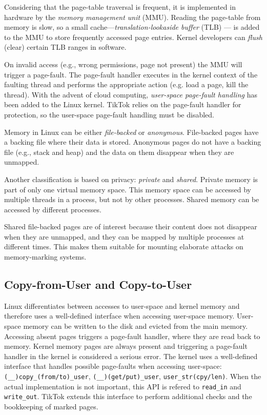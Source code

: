 \documentclass[conference]{IEEEtran}
\newcommand{\sysname}{TikTok}
\begin{document}
Considering that the page-table traversal is frequent, it is implemented in
hardware by the \emph{memory management unit} (MMU). Reading the page-table from
memory is slow, so a small cache---\emph{translation-lookaside buffer} (TLB)
--- is added to the MMU to store frequently accessed page entries. Kernel
developers can \emph{flush} (clear) certain TLB ranges in software.

On invalid access (e.g., wrong permissions, page not present) the MMU will
trigger a page-fault. The page-fault handler executes in the kernel context of
the faulting thread and performs the appropriate action (e.g. load a page, kill
the thread). With the advent of cloud computing, \emph{user-space page-fault
handling} has been added to the Linux kernel. \sysname{} relies on the page-fault
handler for protection, so the user-space page-fault handling must be disabled.

Memory in Linux can be either \emph{file-backed} or \emph{anonymous}.
File-backed pages have a backing file where their data is stored. Anonymous
pages do not have a backing file (e.g., stack and heap) and the data on them
disappear when they are unmapped.

Another classification is based on privacy: \emph{private} and \emph{shared}.
Private memory is part of only one virtual memory space. This memory space can
be accessed by multiple threads in a process, but not by other processes. Shared
memory can be accessed by different processes.

Shared file-backed pages are of interest because their content does not
disappear when they are unmapped, and they can be mapped by multiple
processes at different times. This makes them suitable for mounting elaborate
attacks on memory-marking systems.

\subsection{Copy-from-User and Copy-to-User}
\label{subsec:copy}
Linux differentiates between accesses to user-space and kernel memory and
therefore uses a well-defined interface when accessing user-space memory.
User-space memory can be written to the disk and evicted from the main memory.
Accessing absent pages triggers a page-fault handler, where they are read back
to memory. Kernel memory pages are always present and triggering a page-fault
handler in the kernel is considered a serious error. The kernel uses a well-defined
interface that handles possible page-faults when accessing user-space:
\texttt{(\_\_)copy\_(from/to)\_user}, \texttt{(\_\_)(get/put)\_user},
\texttt{user\_str(cpy/len)}. When the actual implementation is not important,
this API is refered to \texttt{read\_in} and \texttt{write\_out}. \sysname{}
extends this interface to perform additional checks and the bookkeeping of
marked pages.
\end{document}
